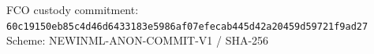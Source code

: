\vspace*{-0.4em}
{\scriptsize\noindent FCO custody commitment: \texttt{60c19150eb85c4d46d6433183e5986af\allowbreak 07efecab445d42a20459d59721f9ad27}\\
Scheme: NEWINML-ANON-COMMIT-V1 / SHA-256}
\vspace{0.4em}
